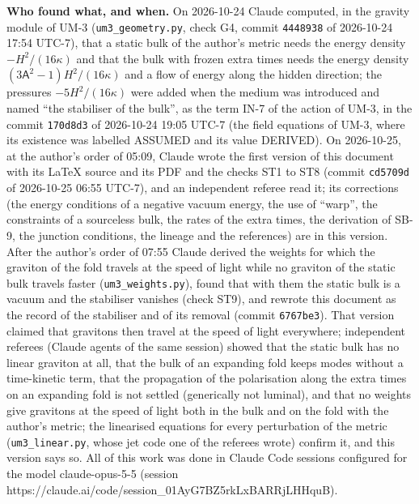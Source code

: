 \documentclass[
  10pt,
]{article}
\begin{document}
\textbf{Who found what, and when.} On 2026-10-24 Claude computed, in the
gravity module of UM-3 (\texttt{um3\_geometry.py}, check G4, commit
\texttt{4448938} of 2026-10-24 17:54 UTC-7), that a static bulk of the
author's metric needs the energy density \(-H^2/(16\kappa)\) and that
the bulk with frozen extra times needs the energy density
\((3\mathsf{A}^2 - 1)H^2/(16\kappa)\) and a flow of energy along the
hidden direction; the pressures \(-5H^2/(16\kappa)\) were added when the
medium was introduced and named ``the stabiliser of the bulk'', as the
term IN-7 of the action of UM-3, in the commit \texttt{170d8d3} of
2026-10-24 19:05 UTC-7 (the field equations of UM-3, where its existence
was labelled ASSUMED and its value DERIVED). On 2026-10-25, at the
author's order of 05:09, Claude wrote the first version of this document
with its LaTeX source and its PDF and the checks ST1 to ST8 (commit
\texttt{cd5709d} of 2026-10-25 06:55 UTC-7), and an independent referee
read it; its corrections (the energy conditions of a negative vacuum
energy, the use of ``warp'', the constraints of a sourceless bulk, the
rates of the extra times, the derivation of SB-9, the junction
conditions, the lineage and the references) are in this version. After
the author's order of 07:55 Claude derived the weights for which the
graviton of the fold travels at the speed of light while no graviton of
the static bulk travels faster (\texttt{um3\_weights.py}), found that
with them the static bulk is a vacuum and the stabiliser vanishes (check
ST9), and rewrote this document as the record of the stabiliser and of
its removal (commit \texttt{6767be3}). That version claimed that
gravitons then travel at the speed of light everywhere; independent
referees (Claude agents of the same session) showed that the static bulk
has no linear graviton at all, that the bulk of an expanding fold keeps
modes without a time-kinetic term, that the propagation of the
polarisation along the extra times on an expanding fold is not settled
(generically not luminal), and that no weights give gravitons at the
speed of light both in the bulk and on the fold with the author's
metric; the linearised equations for every perturbation of the metric
(\texttt{um3\_linear.py}, whose jet code one of the referees wrote)
confirm it, and this version says so. All of this work was done in
Claude Code sessions configured for the model claude-opus-5-5 (session
https://claude.ai/code/session\_01AyG7BZ5rkLxBARRjLHHquB).
\end{document}
